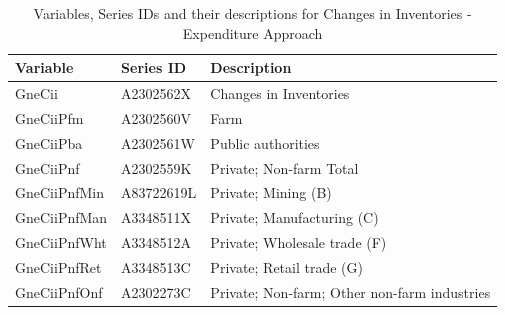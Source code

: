 \documentclass[a4paper, 11pt]{article}
\begin{document}
\begin{table}[h]
	\caption{Variables, Series IDs and their descriptions for Changes in Inventories - Expenditure Approach}
	\small
	\centering
	\begin{tabular*}{\columnwidth}[width = \textwidth]{lll}
		\toprule
		\textbf{Variable} & \textbf{Series ID} & \textbf{Description}\\
		\midrule
		GneCii       & A2302562X  & Changes in Inventories\\
		GneCiiPfm    & A2302560V  & Farm\\
		GneCiiPba    & A2302561W  & Public authorities\\
		GneCiiPnf    & A2302559K  & Private; Non-farm Total\\
		GneCiiPnfMin & A83722619L & Private; Mining (B)\\
		\addlinespace
		GneCiiPnfMan & A3348511X  & Private; Manufacturing (C)\\
		GneCiiPnfWht & A3348512A  & Private; Wholesale trade (F)\\
		GneCiiPnfRet & A3348513C  & Private; Retail trade (G)\\
		GneCiiPnfOnf & A2302273C  & Private; Non-farm; Other non-farm industries\\
		\bottomrule
	\end{tabular*}
	\label{Tab:Expenditure-hierarchy-2}
\end{table}
\end{document}
